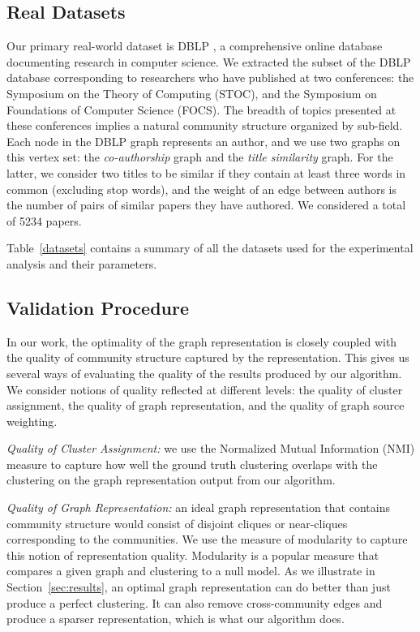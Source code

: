 \documentclass[twoside,twocolumn]{article}
\begin{document}
\subsection{Real Datasets}
Our primary real-world dataset is DBLP \cite{Ley02}, a comprehensive online
database documenting research in computer science. We extracted the subset of
the DBLP database corresponding to researchers who have published at two
conferences: the Symposium on the Theory of Computing (STOC), and the Symposium
on Foundations of Computer Science (FOCS). The breadth of topics presented at
these conferences implies a natural community structure organized by sub-field.
Each node in the DBLP graph represents an author, and we use two graphs on this
vertex set: the {\em co-authorship} graph and the {\em title similarity} graph.
For the latter, we consider two titles to be similar if they contain at least
three words in common (excluding stop words), and the weight of an edge between
authors is the number of pairs of similar papers they have authored. We
considered a total of 5234 papers.

Table~\ref{datasets} contains a summary of all the datasets used for the
experimental analysis and their parameters.


\subsection{Validation Procedure} 
\label{sec:validation}
In our work, the optimality of the graph representation is closely coupled with
the quality of community structure captured by the representation. This gives
us several ways of evaluating the quality of the results produced by our
algorithm. We consider notions of quality reflected at different levels: the
quality of cluster assignment, the quality of graph representation, and the
quality of graph source weighting.

{\em Quality of Cluster Assignment:} we use the Normalized Mutual Information
(NMI) measure \cite{Danon05} to capture how well the ground truth clustering
overlaps with the clustering on the graph representation output from our
algorithm. 

{\em Quality of Graph Representation:} an ideal graph representation that
contains community structure would consist of disjoint cliques or near-cliques
corresponding to the communities. We use the measure of modularity
\cite{Newman06} to capture this notion of representation quality. Modularity is
a popular measure that compares a given graph and clustering to a null
model. 
As we illustrate in Section~\ref{sec:results}, an optimal graph representation can do
better than just produce a perfect clustering. It can also remove
cross-community edges and produce a sparser representation, which is what our
algorithm does.
 
\end{document}
